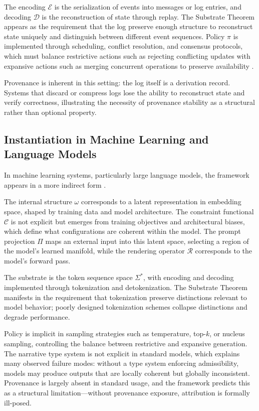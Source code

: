 \documentclass[12pt, a4paper]{article}
\theoremstyle{plain}
\theoremstyle{definition}
\theoremstyle{remark}
\begin{document}
The encoding $\mathcal{E}$ is the serialization of events into messages or log entries, and decoding $\mathcal{D}$ is the reconstruction of state through replay. The Substrate Theorem appears as the requirement that the log preserve enough structure to reconstruct state uniquely and distinguish between different event sequences. Policy $\pi$ is implemented through scheduling, conflict resolution, and consensus protocols, which must balance restrictive actions such as rejecting conflicting updates with expansive actions such as merging concurrent operations to preserve availability \cite{gilbert2002}.

Provenance is inherent in this setting: the log itself is a derivation record. Systems that discard or compress logs lose the ability to reconstruct state and verify correctness, illustrating the necessity of provenance stability as a structural rather than optional property.

\subsection{Instantiation in Machine Learning and Language Models}

In machine learning systems, particularly large language models, the framework appears in a more indirect form \cite{vaswani2017,brown2020}.

The internal structure $\omega$ corresponds to a latent representation in embedding space, shaped by training data and model architecture. The constraint functional $\mathcal{C}$ is not explicit but emerges from training objectives and architectural biases, which define what configurations are coherent within the model. The prompt projection $\Pi$ maps an external input into this latent space, selecting a region of the model's learned manifold, while the rendering operator $\mathcal{R}$ corresponds to the model's forward pass.

The substrate is the token sequence space $\Sigma^*$, with encoding and decoding implemented through tokenization and detokenization. The Substrate Theorem manifests in the requirement that tokenization preserve distinctions relevant to model behavior; poorly designed tokenization schemes collapse distinctions and degrade performance.

Policy is implicit in sampling strategies such as temperature, top-$k$, or nucleus sampling, controlling the balance between restrictive and expansive generation. The narrative type system is not explicit in standard models, which explains many observed failure modes: without a type system enforcing admissibility, models may produce outputs that are locally coherent but globally inconsistent. Provenance is largely absent in standard usage, and the framework predicts this as a structural limitation---without provenance exposure, attribution is formally ill-posed.
\end{document}
